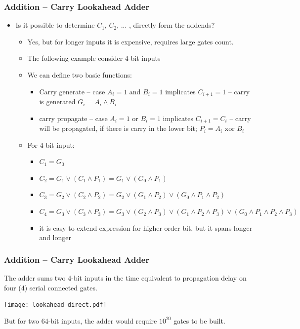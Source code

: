 \documentclass{beamer}
\begin{document}
\begin{frame}
\frametitle{Addition -- Carry Lookahead Adder}

\begin{itemize}
\item Is it possible to determine $C_1$, $C_2$, ... , directly form the addends?
\begin{itemize}
\item Yes, but for longer inputs it is expensive, requires large gates count.
\item The following example consider 4-bit inputs
\item We can define two basic functions:
\begin{itemize}
\item Carry generate -- case $A_i=1$ and $B_i=1$ implicates $C_{i+1}=1$ -- carry is generated $G_i=A_i \land B_i$ 
\item carry propagate -- case $A_i=1$ or $B_i=1$ implicates $C_{i+1}=C_{i}$ -- carry will be propagated, if there is carry in the lower bit; $P_i=A_i$ xor $B_i$ 
\end{itemize}
\item For 4-bit input:
\begin{itemize}
\item $C_1=G_0$ 
\item $C_2=G_1 \lor (C_1 \land P_1)= G_1 \lor (G_0 \land P_1)$
\item $C_3=G_2 \lor (C_2 \land P_2)= G_2 \lor (G_1 \land P_2) \lor (G_0 \land P_1 \land P_2)$ 
\item $C_4=G_3 \lor (C_3 \land P_3)= G_3 \lor (G_2 \land P_3) \lor (G_1 \land P_2 \land P_3) \lor (G_0 \land P_1 \land P_2 \land P_3)$
\item it is easy to extend expression for higher order bit, but it spans longer and longer
\end{itemize}
\end{itemize}
\end{itemize}

\end{frame}

\begin{frame}
\frametitle{Addition -- Carry Lookahead Adder}

The adder sums two 4-bit inputs in the time equivalent to propagation delay on four (4) serial connected gates.

\begin{center}
   \texttt{[image: lookahead\_direct.pdf]}
\end{center}

But for two 64-bit inputs, the adder would require $10^{20}$ gates to be built.
\end{frame}
\end{document}
